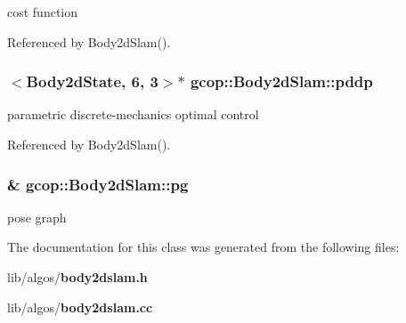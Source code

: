 cost function 



\-Referenced by \-Body2d\-Slam().

\subsubsection[{pddp}]{$<${\bf \-Body2d\-State}, 6, 3$>$$\ast$ {\bf gcop\-::\-Body2d\-Slam\-::pddp}}\label{classgcop_1_1Body2dSlam_a20dedd0cffd5decf723c9f7590b89e61}


parametric discrete-\/mechanics optimal control 



\-Referenced by \-Body2d\-Slam().

\subsubsection[{pg}]{\& {\bf gcop\-::\-Body2d\-Slam\-::pg}}\label{classgcop_1_1Body2dSlam_aa1df4210bd9e78cb39c08b42de3928e1}


pose graph 



\-The documentation for this class was generated from the following files\-:\begin{DoxyCompactItemize}
\item 
lib/algos/{\bf body2dslam.\-h}\item 
lib/algos/{\bf body2dslam.\-cc}\end{DoxyCompactItemize}
